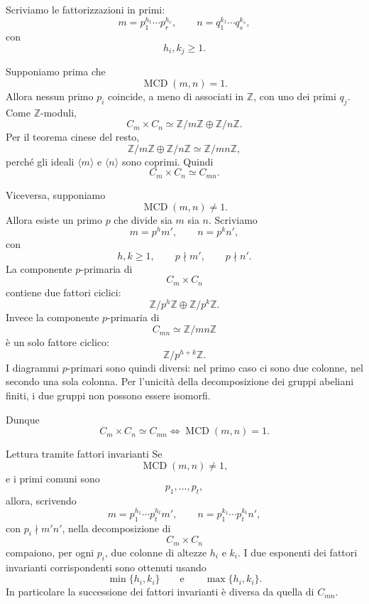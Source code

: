 \documentclass[a4paper]{article}
\begin{document}
\begin{radioactive}
\begin{snippetproof}{}
    Scriviamo le fattorizzazioni in primi:
    \[
        m=p_1^{h_1}\cdots p_r^{h_r},
        \qquad
        n=q_1^{k_1}\cdots q_s^{k_s},
    \]
    con
    \[
        h_i,k_j\geq 1.
    \]

    Supponiamo prima che
    \[
        \operatorname{MCD}(m,n)=1.
    \]
    Allora nessun primo \(p_i\) coincide, a meno di associati in \(\mathbb{Z}\), con uno dei primi \(q_j\).
    Come \(\mathbb{Z}\)-moduli,
    \[
        C_m\times C_n
        \simeq
        \mathbb{Z}/m\mathbb{Z}\oplus \mathbb{Z}/n\mathbb{Z}.
    \]
    Per il teorema cinese del resto,
    \[
        \mathbb{Z}/m\mathbb{Z}\oplus \mathbb{Z}/n\mathbb{Z}
        \simeq
        \mathbb{Z}/mn\mathbb{Z},
    \]
    perché gli ideali \(\langle m \rangle\) e \(\langle n \rangle\) sono coprimi.
    Quindi
    \[
        C_m\times C_n\simeq C_{mn}.
    \]

    Viceversa, supponiamo
    \[
        \operatorname{MCD}(m,n)\neq 1.
    \]
    Allora esiste un primo \(p\) che divide sia \(m\) sia \(n\).
    Scriviamo
    \[
        m=p^h m',
        \qquad
        n=p^k n',
    \]
    con
    \[
        h,k\geq 1,
        \qquad
        p\nmid m',
        \qquad
        p\nmid n'.
    \]
    La componente \(p\)-primaria di
    \[
        C_m\times C_n
    \]
    contiene due fattori ciclici:
    \[
        \mathbb{Z}/p^h\mathbb{Z}
        \oplus
        \mathbb{Z}/p^k\mathbb{Z}.
    \]
    Invece la componente \(p\)-primaria di
    \[
        C_{mn}
        \simeq
        \mathbb{Z}/mn\mathbb{Z}
    \]
    è un solo fattore ciclico:
    \[
        \mathbb{Z}/p^{h+k}\mathbb{Z}.
    \]
    I diagrammi \(p\)-primari sono quindi diversi: nel primo caso ci sono due colonne, nel secondo una sola colonna. Per l'unicità della decomposizione dei gruppi abeliani finiti, i due gruppi non possono essere isomorfi.

    Dunque
    \[
        C_m\times C_n\simeq C_{mn}
        \iff
        \operatorname{MCD}(m,n)=1.
    \]
\end{snippetproof}
\end{radioactive}

\begin{radioactive}
\begin{snippetremark}{Lettura tramite fattori invarianti}
    Se
    \[
        \operatorname{MCD}(m,n)\neq 1,
    \]
    e i primi comuni sono
    \[
        p_1,\ldots,p_t,
    \]
    allora, scrivendo
    \[
        m=p_1^{h_1}\cdots p_t^{h_t}m',
        \qquad
        n=p_1^{k_1}\cdots p_t^{k_t}n',
    \]
    con \(p_i\nmid m'n'\), nella decomposizione di
    \[
        C_m\times C_n
    \]
    compaiono, per ogni \(p_i\), due colonne di altezze \(h_i\) e \(k_i\).
    I due esponenti dei fattori invarianti corrispondenti sono ottenuti usando
    \[
        \min\{h_i,k_i\}
        \qquad
        \text{e}
        \qquad
        \max\{h_i,k_i\}.
    \]
    In particolare la successione dei fattori invarianti è diversa da quella di \(C_{mn}\).
\end{snippetremark}
\end{radioactive}
\end{document}
